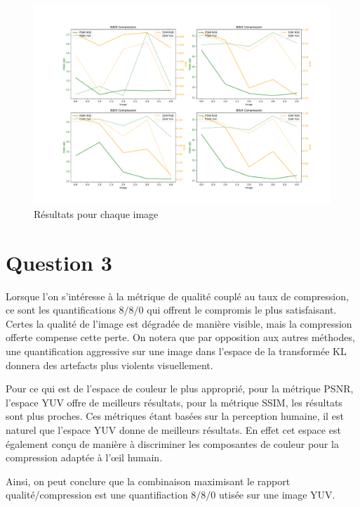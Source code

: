 \documentclass{article}[letterpaper, 11pt]
\begin{document}
\begin{figure}[h]
    \centering
    \includegraphics[scale=0.35]{all.pdf}
    \caption{Résultats pour chaque image}
\end{figure}
\newpage
\section{Question 3}
Lorsque l'on s'intéresse à la métrique de qualité couplé au taux de compression, ce sont les quantifications $8/8/0$ qui offrent le compromis le plus satisfaisant. Certes la qualité de l'image est dégradée de manière visible, mais la compression offerte compense cette perte. On notera que par opposition aux autres méthodes, une quantification aggressive sur une image dans l'espace de la transformée KL donnera des artefacts plus violents visuellement.

Pour ce qui est de l'espace de couleur le plus approprié, pour la métrique PSNR, l'espace YUV offre de meilleurs résultats, pour la métrique SSIM, les résultats sont plus proches. Ces métriques étant basées sur la perception humaine, il est naturel que l'espace YUV donne de meilleurs résultats. En effet cet espace est également conçu de manière à discriminer les composantes de couleur pour la compression adaptée à l'œil humain.

Ainsi, on peut conclure que la combinaison maximisant le rapport qualité/compression est une quantifiaction $8/8/0$ utisée sur une image YUV.\@
\end{document}
